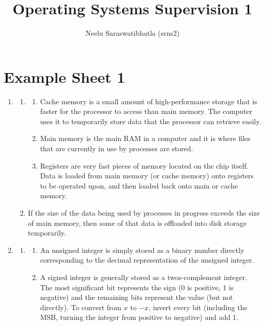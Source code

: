 \documentclass[12pt]{article}
\author{Neelu Saraswatibhatla (srns2)}
\title{Operating Systems Supervision 1}
\date{\vspace{-5ex}}
\begin{document}
\maketitle

\section{Example Sheet 1}
\begin{enumerate}
    \item \begin{enumerate}
              \item \begin{enumerate}
                        \item Cache memory is a small amount of high-performance storage that is faster for the processor to access than main memory. The computer uses it to temporarily store data that the processor can retrieve easily.
                        \item Main memory is the main RAM in a computer and it is where files that are currently in use by processes are stored.
                        \item Registers are very fast pieces of memory located on the chip itself. Data is loaded from main memory (or cache memory) onto registers to be operated upon, and then loaded back onto main or cache memory.
                    \end{enumerate}
              \item If the size of the data being used by processes in progress exceeds the size of main memory, then some of that data is offloaded into disk storage temporarily.
          \end{enumerate}
    \item \begin{enumerate}
              \item \begin{enumerate}
                        \item An unsigned integer is simply stored as a binary number directly corresponding to the decimal representation of the unsigned integer.
                        \item A signed integer is generally stored as a twos-complement integer. The most significant bit represents the sign (0 is positive, 1 is negative) and the remaining bits represent the value (but not directly). To convert from $x$ to $-x$, invert every bit (including the MSB, turning the integer from positive to negative) and add 1.

\end{enumerate}
\end{enumerate}
\end{enumerate}
\end{document}
